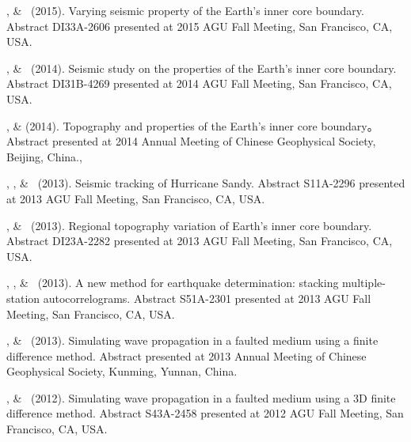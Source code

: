 \begin{etaremune}
\item
    \Me, \& \LWen\ (2015).
    Varying seismic property of the Earth's inner core boundary.
    Abstract DI33A-2606 presented at 2015 AGU Fall Meeting, San Francisco, CA, USA.
\item
    \Me, \& \LWen\ (2014).
    Seismic study on the properties of the Earth's inner core boundary.
    Abstract DI31B-4269 presented at 2014 AGU Fall Meeting, San Francisco, CA, USA.
\item
    \Me, \& \LWen (2014).
    Topography and properties of the Earth's inner core boundary。
    Abstract presented at 2014 Annual Meeting of Chinese Geophysical Society, Beijing, China.,
\item
    \XChen, \Me, \& \LWen\ (2013).
    Seismic tracking of Hurricane Sandy.
    Abstract S11A-2296 presented at 2013 AGU Fall Meeting, San Francisco, CA, USA.
\item
    \Me, \& \LWen\ (2013).
    Regional topography variation of Earth's inner core boundary.
    Abstract DI23A-2282 presented at 2013 AGU Fall Meeting, San Francisco, CA, USA.
\item
    \MZhang, \Me, \& \LWen\ (2013).
    A new method for earthquake determination: stacking multiple-station autocorrelograms.
    Abstract S51A-2301 presented at 2013 AGU Fall Meeting, San Francisco, CA, USA.
\item
    \Me, \& \LWen\ (2013).
    Simulating wave propagation in a faulted medium using a finite difference method.
    Abstract presented at 2013 Annual Meeting of Chinese Geophysical Society, Kunming, Yunnan, China.
\item
    \Me, \& \LWen\ (2012).
    Simulating wave propagation in a faulted medium using a 3D finite difference method.
    Abstract S43A-2458 presented at 2012 AGU Fall Meeting, San Francisco, CA, USA.
\end{etaremune}
